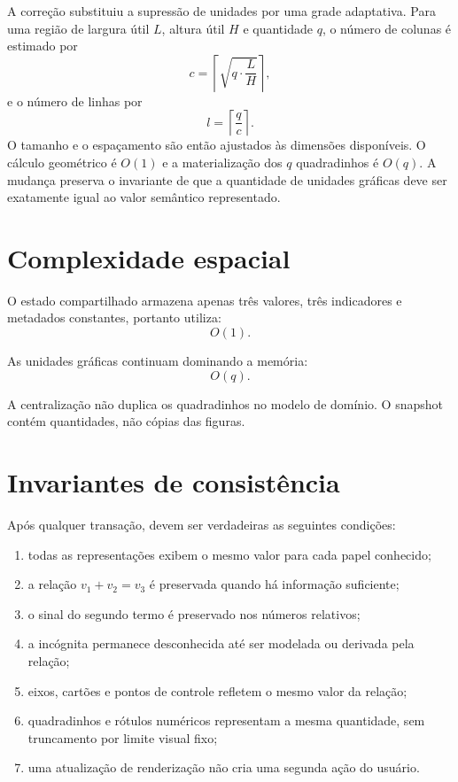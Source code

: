 \documentclass[12pt,a4paper]{article}
\begin{document}
A correção substituiu a supressão de unidades por uma grade adaptativa. Para uma região de largura útil $L$, altura útil $H$ e quantidade $q$, o número de colunas é estimado por
\[
c=\left\lceil\sqrt{q\cdot\frac{L}{H}}\right\rceil,
\]
e o número de linhas por
\[
l=\left\lceil\frac{q}{c}\right\rceil.
\]
O tamanho e o espaçamento são então ajustados às dimensões disponíveis. O cálculo geométrico é $O(1)$ e a materialização dos $q$ quadradinhos é $O(q)$. A mudança preserva o invariante de que a quantidade de unidades gráficas deve ser exatamente igual ao valor semântico representado.

\section{Complexidade espacial}

O estado compartilhado armazena apenas três valores, três indicadores e metadados constantes, portanto utiliza:
\[
O(1).
\]

As unidades gráficas continuam dominando a memória:
\[
O(q).
\]

A centralização não duplica os quadradinhos no modelo de domínio. O snapshot contém quantidades, não cópias das figuras.

\section{Invariantes de consistência}

Após qualquer transação, devem ser verdadeiras as seguintes condições:
\begin{enumerate}[noitemsep]
  \item todas as representações exibem o mesmo valor para cada papel conhecido;
  \item a relação $v_1+v_2=v_3$ é preservada quando há informação suficiente;
  \item o sinal do segundo termo é preservado nos números relativos;
  \item a incógnita permanece desconhecida até ser modelada ou derivada pela relação;
  \item eixos, cartões e pontos de controle refletem o mesmo valor da relação;
  \item quadradinhos e rótulos numéricos representam a mesma quantidade, sem truncamento por limite visual fixo;
  \item uma atualização de renderização não cria uma segunda ação do usuário.
\end{enumerate}
\end{document}
